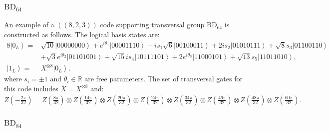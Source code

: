 \documentclass[8pt]{article}
\theoremstyle{definition}
\begin{document}
\subsubsection{\texorpdfstring{$\mathrm{BD}_{64}$}{BD₆₄}}

An example of a \(((8,2,3))\) code supporting transversal group \(\mathrm{BD}_{64}\) is constructed as follows. The logical basis states are:
\begin{align*}
    8\left|0_{L}\right\rangle = & \sqrt{10}\left|00000000\right\rangle +e^{i\theta_{1}}\left|00001110\right\rangle +is_{1}\sqrt{6}\left|00100011\right\rangle +2is_{2}\left|01010111\right\rangle +\sqrt{8}s_{3}\left|01100110\right\rangle \\
                                & +\sqrt{3}e^{i\theta_{2}}\left|01101001\right\rangle +\sqrt{15}is_{4}\left|10111101\right\rangle +2e^{i\theta_{3}}\left|11000101\right\rangle +\sqrt{13}s_{5}\left|11011010\right\rangle,                  \\
    \left|1_{L}\right\rangle =  & X^{\otimes8}\left|0_{L}\right\rangle.
\end{align*}
where \(s_i = \pm 1\) and \(\theta_i \in \mathbb{R}\) are free parameters. The set of transversal gates for this code includes \(\overline{X} = X^{\otimes 8}\) and:
\[ \overline{Z\left(-\tfrac{2\pi}{32}\right)}=Z\left(\tfrac{8\pi}{32}\right)\otimes Z\left(\tfrac{14\pi}{32}\right)\otimes Z\left(\tfrac{20\pi}{32}\right)\otimes Z\left(\tfrac{24\pi}{32}\right)\otimes Z\left(\tfrac{34\pi}{32}\right)\otimes Z\left(\tfrac{46\pi}{32}\right)\otimes Z\left(\tfrac{48\pi}{32}\right)\otimes Z\left(\tfrac{60\pi}{32}\right).\]

\subsubsection{\texorpdfstring{$\mathrm{BD}_{84}$}{BD₈₄}}
\end{document}
